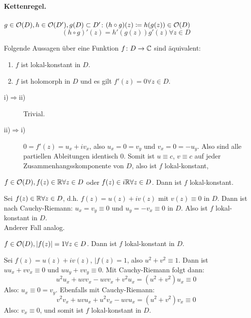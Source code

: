 \paragraph{Kettenregel.} $ g\in\mathcal O(D), h\in\mathcal O(D'), g(D)\subset D' $: $ (h\circ g)(z)\coloneqq h(g(z))\in\mathcal O(D) $
\[ (h\circ g)'(z)=h'(g(z))g'(z)\forall z\in D \]
\newpage
\begin{proposition}
	Folgende Aussagen \"uber eine Funktion $ f\colon D\rightarrow\mathbb{C} $ sind \"aquivalent:
	\begin{enumerate}
		\item $ f $ ist lokal-konstant in $ D $.
		\item $ f $ ist holomorph in $ D $ und es gilt $ f'(z)=0\forall z\in D $.
	\end{enumerate}
\end{proposition}
\begin{beweis}
	\begin{description}
		\item[i)$ \Rightarrow $ii)] Trivial.
		\item[ii)$ \Rightarrow $i)] $ 0=f'(z)=u_x+iv_x $, also $ u_x=0=v_y $ und $ v_x=0=-u_y $. Also sind alle partiellen Ableitungen identisch $ 0 $. Somit ist $ u\equiv c $, $ v\equiv c $ auf jeder Zusammenhangsskomponente von $ D $, also ist $ f $ lokal-konstant,
	\end{description}
\end{beweis}
\begin{korollar}
	$ f\in\mathcal O(D), f(z)\in\mathbb{R}\forall z\in D  $ oder $ f(z)\in i\mathbb{R}\forall z\in D $. Dann ist $ f $ lokal-konstant.
\end{korollar}
\begin{beweis}
	Sei $ f(z)\in\mathbb{R}\forall z\in D $, d.h. $ f(z)=u(z)+iv(z) $ mit $ v(z)\equiv 0 $ in $ D $. Dann ist nach Cauchy-Riemann: $ u_x=v_y\equiv 0 $ und $ u_y=-v_x\equiv 0 $ in $ D $. Also ist $ f $ lokal-konstant in $ D $.\\
	Anderer Fall analog.
\end{beweis}
\begin{korollar}
	$ f\in\mathcal O(D), |f(z)|=1\forall z\in D $. Dann ist $ f $ lokal-konstant in $ D $.
\end{korollar}
\begin{beweis}
	Sei $ f(z)=u(z)+iv(z) $, $ |f(z)=1 $, also $ u^2+v^2\equiv 1 $. Dann ist $ uu_x+vv_x\equiv 0 $ und $ uu_y+vv_y\equiv 0 $. Mit Cauchy-Riemann folgt dann:
	\[ u^2u_x+uvv_x-uvv_x+v^2u_x=(u^2+v^2)u_x\equiv 0 \]
	Also: $ u_x\equiv 0=v_y $. Ebenfalls mit Cauchy-Riemann:
	\[ v^2v_x+uvu_x+u^2v_x-uvu_x=(u^2+v^2)v_x\equiv 0 \]
	Also: $ v_x\equiv 0 $, und somit ist $ f $ lokal-konstant in $ D $.
\end{beweis}
